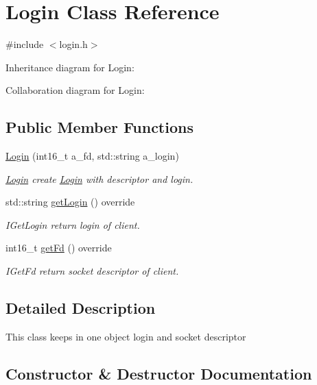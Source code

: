\hypertarget{classLogin}{}\section{Login Class Reference}
\label{classLogin}


{\ttfamily \#include $<$login.\+h$>$}



Inheritance diagram for Login\+:


Collaboration diagram for Login\+:
\subsection*{Public Member Functions}
\begin{DoxyCompactItemize}
\item 
\hyperlink{classLogin_af3d70a69c019ad5d053e660e47858d76}{Login} (int16\+\_\+t a\+\_\+fd, std\+::string a\+\_\+login)
\begin{DoxyCompactList}\small\item\em \hyperlink{classLogin}{Login} create \hyperlink{classLogin}{Login} with descriptor and login. \end{DoxyCompactList}\item 
std\+::string \hyperlink{classLogin_a1135567abbbc69a13b1ee618066e7fa0}{get\+Login} () override
\begin{DoxyCompactList}\small\item\em I\+Get\+Login return login of client. \end{DoxyCompactList}\item 
int16\+\_\+t \hyperlink{classLogin_a0fc2d614cd55e0ae0e084e92b3a1908e}{get\+Fd} () override
\begin{DoxyCompactList}\small\item\em I\+Get\+Fd return socket descriptor of client. \end{DoxyCompactList}\end{DoxyCompactItemize}


\subsection{Detailed Description}
This class keeps in one object login and socket descriptor 

\subsection{Constructor \& Destructor Documentation}
